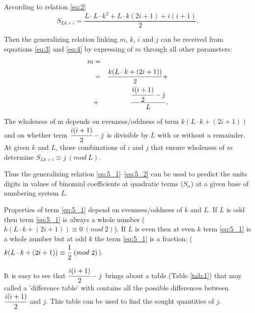 \documentclass[12pt, twoside, leqno]{article}
\theoremstyle{definition}
\numberwithin{equation}{section}
\begin{document}
According to relation \ref{eq:2}
\begin{equation}
S_{Lk+i} = \frac{L\cdot L\cdot k^2 + L\cdot k(2i + 1) + i(i +1)}{2}.
\label{eq:4}
\end{equation}

Then the generalizing relation linking $m$, $k$, $i$ and $j$ can be received from equations \ref{eq:3} and \ref{eq:4} by expressing of $m$ through all other parameters:
\begin{eqnarray}
m& = & \nonumber \\
&= & \frac{k(L\cdot k + (2i + 1))}{2} + \label{eq:5_1}\\
&+ &\frac{\cfrac{i(i +1)}{2}- j}{L}. \label{eq:5_2}
\end{eqnarray}

The wholeness of m depends on evenness/oddness of term $k(L\cdot k + (2i + 1))$ and on whether term $\cfrac{i(i +1)}{2}- j$ is divisible by $L$ with or without a remainder. At given $k$ and $L$, those combinations of $i$ and $j$ that ensure wholeness of $m$ determine $S_{Lk+i} \equiv j \ (mod \ L)$.

Thus the generalizing relation \ref{eq:5_1}--\ref{eq:5_2} can be used to predict the units digits in values of binomial coefficients at quadratic terms ($S_n$) at a given base of numbering system $L$.

Properties of term \ref{eq:5_1} depend on evenness/oddness of $k$ and $L$. If $L$ is odd then term \ref{eq:5_1} is always a whole number ($k(L\cdot k + (2i + 1)) \equiv 0 \ (mod \ 2)$). If $L$ is even then at even $k$ term \ref{eq:5_1} is a whole number but at odd $k$ the term \ref{eq:5_1} is a fraction: ($k(L\cdot k + (2i + 1)) \equiv \cfrac{1}{2} \ (mod \ 2)$).

It is easy to see that $\cfrac{i(i +1)}{2}- j$ brings about a table (Table \ref{tab:1}) that may called a 'difference table' with contains all the possible differences between $\cfrac{i(i +1)}{2}$ and $j$. This table can be used to find the sought quantities of $j$.
\end{document}
